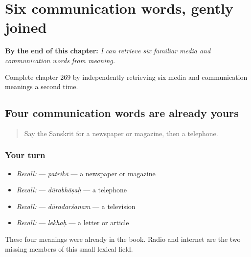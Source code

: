 
\chapter{Six communication words, gently joined}
\label{ch:sa-media-communication}

\begin{chapteropening}
\textbf{By the end of this chapter:} \emph{I can retrieve six familiar media and communication words from meaning.}

Complete chapter 269 by independently retrieving six media and communication meanings a second time.
\end{chapteropening}

\section[(media-word recall)]{Four communication words are already yours}

\label{lesson:SA-C269-media-recall}



\begin{quote}
Say the Sanskrit for a newspaper or magazine, then a telephone.
\end{quote}

\subsection*{Your turn}
\begin{itemize}
\raggedright
  \item \emph{Recall:} \textbf{} — \emph{patrikā} — a newspaper or magazine
  \item \emph{Recall:} \textbf{} — \emph{dūrabhāṣaḥ} — a telephone
  \item \emph{Recall:} \textbf{} — \emph{dūradarśanam} — a television
  \item \emph{Recall:} \textbf{} — \emph{lekhaḥ} — a letter or article
\end{itemize}

\begin{grammarlens}[title={What you've built}]
These four meanings were already in the book. Radio and internet are the two missing members of this small lexical field.
\end{grammarlens}

